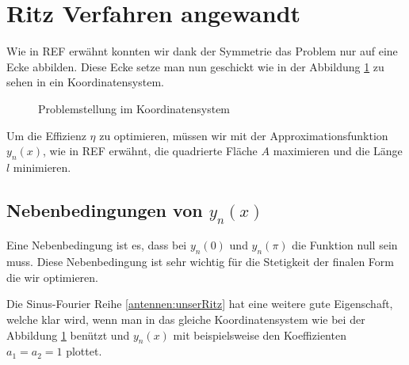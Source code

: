 %
%
% 
%
%



\section{Ritz Verfahren angewandt\label{antennen:ritzAnw}}


Wie in REF erwähnt konnten wir dank der Symmetrie das Problem nur auf eine Ecke abbilden. Diese Ecke setze man nun geschickt wie in der Abbildung \ref{antennen:koordSysBsp} zu sehen in ein Koordinatensystem.

\begin{figure}[htbp]
	\centering
	\caption{Problemstellung im Koordinatensystem}
	\label{antennen:koordSysBsp}
\end{figure}
Um die Effizienz $\eta$ zu optimieren, müssen wir mit der Approximationsfunktion
$y_n(x)$, wie in REF %
erwähnt, die quadrierte Fläche $A$ maximieren und die Länge $l$ minimieren.


\subsection{Nebenbedingungen von $y_n(x)$\label{antenennen:nebenbedRitz}}

Eine Nebenbedingung ist es, dass bei $y_n(0)$ und $y_n(\pi)$ die Funktion null sein muss.
Diese Nebenbedingung ist sehr wichtig für die Stetigkeit der finalen Form die wir optimieren.

Die Sinus-Fourier Reihe \eqref{antennen:unserRitz} hat eine weitere gute Eigenschaft, 
welche klar wird, wenn man in das gleiche Koordinatensystem wie bei der Abbildung \ref{antennen:koordSysBsp}
benützt und $y_n(x)$ mit beispielsweise den Koeffizienten $a_1=a_2=1$ plottet.

